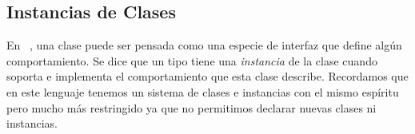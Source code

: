 \subsection{Instancias de Clases}

En \Haskell{}~\cite{marlow2010haskell}, una clase puede ser pensada como una especie de interfaz que define algún comportamiento.
Se dice que un tipo tiene una \textit{instancia} de la clase cuando soporta e implementa el comportamiento que esta clase describe. Recordamos que en este lenguaje tenemos un sistema de clases e instancias con el mismo espíritu pero mucho más restringido ya que no permitimos declarar nuevas clases ni instancias.

